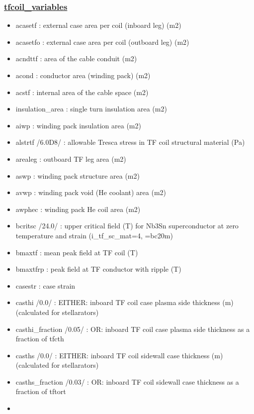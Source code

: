 \documentclass[]{article}
\begin{document}
\subsubsection{\texorpdfstring{\href{tfcoil_variables.html}{tfcoil\_variables}}{tfcoil\_variables}}\label{tfcoil_variables}

\begin{itemize}
\item
  acasetf : external case area per coil (inboard leg) (m2)
\item
  acasetfo : external case area per coil (outboard leg) (m2)
\item
  acndttf : area of the cable conduit (m2)
\item
  acond : conductor area (winding pack) (m2)
\item
  acstf : internal area of the cable space (m2)
\item
  insulation\_area : single turn insulation area (m2)
\item
  aiwp : winding pack insulation area (m2)
\item
  alstrtf /6.0D8/ : allowable Tresca stress in TF coil structural
  material (Pa)
\item
  arealeg : outboard TF leg area (m2)
\item
  aswp : winding pack structure area (m2)
\item
  avwp : winding pack void (He coolant) area (m2)
\item
  awphec : winding pack He coil area (m2)
\item
  bcritsc /24.0/ : upper critical field (T) for Nb3Sn superconductor at
  zero temperature and strain (i\_tf\_sc\_mat=4, =bc20m)
\item
  bmaxtf : mean peak field at TF coil (T)
\item
  bmaxtfrp : peak field at TF conductor with ripple (T)
\item
  casestr : case strain
\item
  casthi /0.0/ : EITHER: inboard TF coil case plasma side thickness (m)
  (calculated for stellarators)
\item
  casthi\_fraction /0.05/ : OR: inboard TF coil case plasma side
  thickness as a fraction of tfcth
\item
  casths /0.0/ : EITHER: inboard TF coil sidewall case thickness (m)
  (calculated for stellarators)
\item
  casths\_fraction /0.03/ : OR: inboard TF coil sidewall case thickness
  as a fraction of tftort
\item

\end{itemize}
\end{document}

